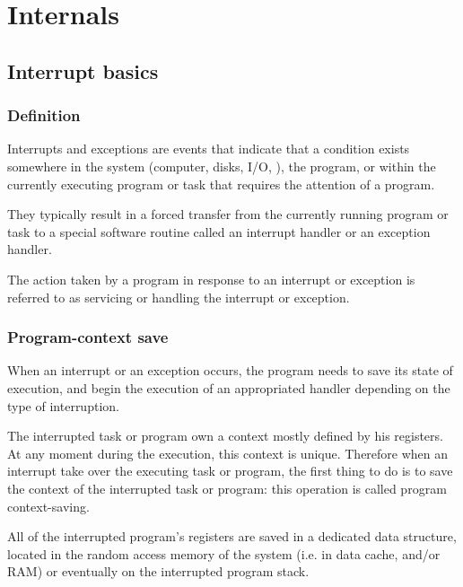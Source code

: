 %
%


\section{Internals}

\subsection{Interrupt basics}


\begin{frame}
  \frametitle{Definition}

Interrupts and exceptions are events that indicate that a condition exists somewhere in the system (computer, disks, I/O, \etc{}), the program, or within the currently executing program or task that requires the attention of a program.

\-

They typically result in a forced transfer from the currently running program or task to a special software routine called an interrupt handler or an exception handler.

\-

The action taken by a program in response to an interrupt or exception is referred to as servicing or handling the interrupt or exception.

\end{frame}


\begin{frame}
  \frametitle{Program-context save}

When an interrupt or an exception occurs, the program needs to save its state of execution, and begin the execution of an appropriated handler depending on the type of interruption.

\-

The interrupted task or program own a context mostly defined by his registers. At any moment during the execution, this context is unique. Therefore when an interrupt take over the executing task or program, the first thing to do is to save the context of the interrupted task or program: this operation is called program context-saving.

\-

All of the interrupted program's registers are saved in a dedicated data structure, located in the random access memory of the system (i.e. in data cache, and/or RAM) or eventually on the interrupted program stack.

\end{frame}

